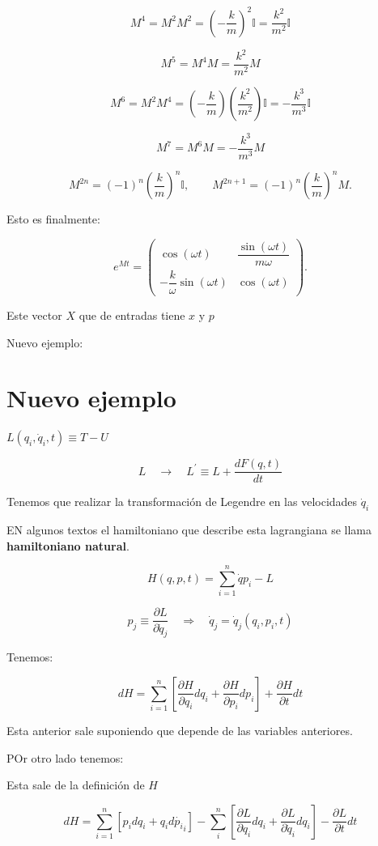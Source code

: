 \documentclass{article}
\begin{document}
\[
M^{4}=M^{2}M^{2}
=
\left(-\frac{k}{m}\right)^{2}\mathbb{I}
=
\frac{k^{2}}{m^{2}}\mathbb{I}
\]

\[
M^{5}=M^{4}M
=
\frac{k^{2}}{m^{2}}M
\]

\[
M^{6}=M^{2}M^{4}
=
\left(-\frac{k}{m}\right)\!\left(\frac{k^{2}}{m^{2}}\right)\mathbb{I}
=
-\frac{k^{3}}{m^{3}}\mathbb{I}
\]

\[
M^{7}=M^{6}M
=
-\frac{k^{3}}{m^{3}}M
\]

\[
\boxed{
M^{2n}=(-1)^{n}\!\left(\frac{k}{m}\right)^{n}\mathbb{I},
\qquad
M^{2n+1}=(-1)^{n}\!\left(\frac{k}{m}\right)^{n}M.
}
\]

Esto es finalmente:


\[
e^{Mt}=
\begin{pmatrix}
\cos(\omega t) & \dfrac{\sin(\omega t)}{m\omega}\\[8pt]
-\dfrac{k}{\omega}\sin(\omega t) & \cos(\omega t)
\end{pmatrix}.
\]


Este vector $X$ que de entradas tiene $x$ y $p$


Nuevo ejemplo:


\section{Nuevo ejemplo}


 $L(q_{i}, \dot{q}_{i},t) \equiv T-U$ 

\[ L \quad \to \quad \boxed{L^{\prime}} \equiv L + \frac{dF(q,t)}{dt}\]

Tenemos que realizar la transformación de Legendre en las velocidades $\boxed{\dot{q}_{i}}$


EN algunos textos el hamiltoniano que describe esta lagrangiana se llama \textbf{hamiltoniano natural}.

\[ H(q,p,t) = \sum\limits_{i=1}^{n} \dot{q}p_{i}-L \]


\[ \boxed{ p_{j} \equiv \frac{\partial L}{\partial \dot{q}_{j}}  } \quad \Rightarrow \quad \dot{q}_{j} = \dot{q}_{j}(q_{i},p_{i},t) \]


Tenemos:


\[ dH = \sum\limits_{i=1}^{n} \left[  \frac{ \partial H }{\partial q_{i}} dq_{i} + \frac{ \partial H }{\partial p_{i}} dp_{i}  \right]  + \frac{\partial H}{\partial t}dt\]

Esta anterior sale suponiendo que depende de las variables anteriores.

POr otro lado tenemos:

Esta sale de la definición de $H$


\[ dH = \sum\limits_{i=1}^{n} \left[  p_{i} dq_{i} + q_{i}d\dot{p_{i}}_{i} \right] - \sum\limits_{i}^{n} \left[   \frac{\partial L}{\partial q_{i}} dq_{i} + \frac{\partial L}{\partial \dot{q}_{i}} dq_{i} \right] - \frac{\partial L}{\partial t}dt \]
\end{document}
